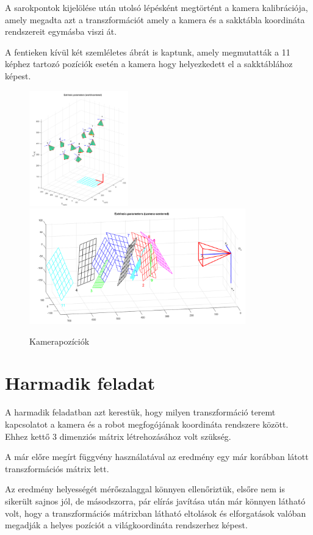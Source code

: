A sarokpontok kijelölése után utolsó lépésként megtörtént a kamera kalibrációja, amely megadta azt a transzformációt amely a kamera és a sakktábla koordináta rendszereit egymásba viszi át.

A fentieken kívül két szemléletes ábrát is kaptunk, amely megmutatták a 11 képhez tartozó pozíciók esetén a kamera hogy helyezkedett el a sakktáblához képest.

\begin{figure}[!h]
	\centering
	\includegraphics[height=50mm, keepaspectratio]{figures/m06/3d_3.png}\hspace{5mm}
	\includegraphics[height=50mm, keepaspectratio]{figures/m06/3d_4.png}
	\caption{Kamerapozíciók}
	\label{fig:calib2}
\end{figure}


\section{Harmadik feladat}

A harmadik feladatban azt kerestük, hogy milyen transzformáció teremt kapcsolatot a kamera és a robot megfogójának koordináta rendszere között. Ehhez kettő 3 dimenziós mátrix létrehozásához volt szükség.


A már előre megírt függvény használatával az eredmény egy már korábban látott transzformációs mátrix lett.

Az eredmény helyességét mérőszalaggal könnyen ellenőriztük, elsőre nem is sikerült sajnos jól, de másodszorra, pár elírás javítása után már könnyen látható volt, hogy a transzformációs mátrixban látható eltolások és elforgatások valóban megadják a helyes pozíciót a világkoordináta rendszerhez képest.












